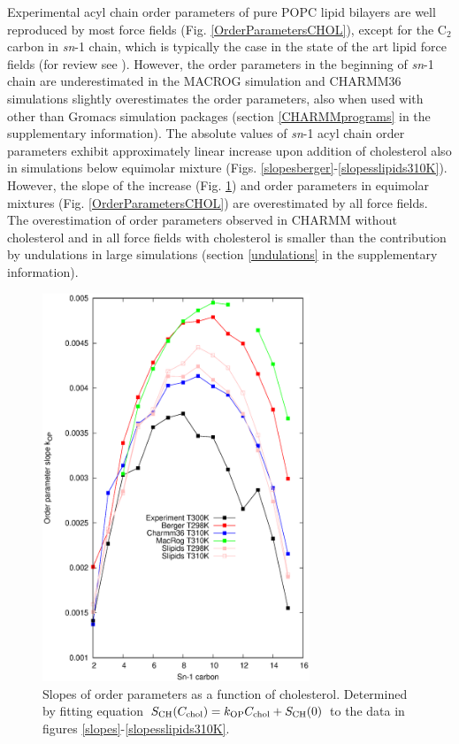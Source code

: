 \documentclass[aps,prl,superscriptaddress,twocolumn]{revtex4}
\begin{document}
Experimental acyl chain order parameters of pure POPC lipid bilayers
are well reproduced by most force fields (Fig. \ref{OrderParametersCHOL}),
except for the C$_2$ carbon in {\it sn}-1 chain,
which is typically the case in the state of the art lipid force fields (for review see \cite{ollila16}).
However, the order parameters in the beginning of {\it sn}-1 chain are underestimated in the
MACROG simulation and CHARMM36 simulations slightly overestimates the order parameters, also when
used with other than Gromacs simulation packages (section \ref{CHARMMprograms} in the supplementary information).
The absolute values of {\it sn}-1 acyl chain order parameters exhibit approximately linear increase upon addition
of cholesterol also in simulations below equimolar mixture (Figs. \ref{slopesberger}-\ref{slopesslipids310K}).
However, the slope of the increase (Fig. \ref{OrderParametersCHOLchanges}) and order parameters
in equimolar mixtures (Fig. \ref{OrderParametersCHOL}) are overestimated by all force fields.
The overestimation of order parameters observed in CHARMM without cholesterol and in all force fields
with cholesterol is smaller than the contribution by undulations in large simulations (section \ref{undulations} in the supplementary information).
\begin{figure}[]
  \centering
  \includegraphics[width=8cm]{../FIGS/slopes.eps}
  \caption{\label{OrderParametersCHOLchanges}
    Slopes of order parameters as a function of cholesterol.
    Determined by fitting equation $S_{\rm CH}(C_{\rm chol})=k_{\rm OP}C_{\rm chol}+S_{\rm CH}(0)$
    to the data in figures \ref{slopes}-\ref{slopesslipids310K}.
  }
\end{figure}
\end{document}
